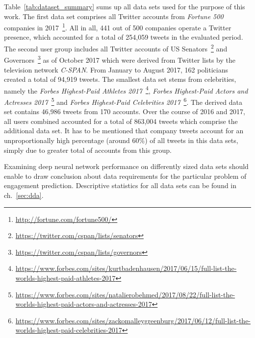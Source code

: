 Table~\ref{tab:dataset_summary} sums up all data sets used for the purpose of
this work.
The first data set comprises all Twitter accounts from \textit{Fortune 500}
companies in 2017~\footnote{\url{http://fortune.com/fortune500/}}.
All in all, 441 out of 500 companies operate a Twitter presence, which accounted
for a total of 254,059 tweets in the evaluated period.
The second user group includes all Twitter accounts of US Senators~\footnote{\url{https://twitter.com/cspan/lists/senators}} and Governors~\footnote{\url{https://twitter.com/cspan/lists/governors}}
as of October 2017 which were derived from Twitter lists by the television
network \textit{C-SPAN}.
From January to August 2017, 162 politicians created a total of 94,919 tweets.
The smallest data set stems from celebrities, namely the \textit{Forbes Highest-Paid
Athletes 2017}~\footnote{\url{https://www.forbes.com/sites/kurtbadenhausen/2017/06/15/full-list-the-worlds-highest-paid-athletes-2017}}, \textit{Forbes Highest-Paid Actors and Actresses 2017}~\footnote{\url{https://www.forbes.com/sites/natalierobehmed/2017/08/22/full-list-the-worlds-highest-paid-actors-and-actresses-2017}} and
\textit{Forbes Highest-Paid Celebrities 2017}~\footnote{\url{https://www.forbes.com/sites/zackomalleygreenburg/2017/06/12/full-list-the-worlds-highest-paid-celebrities-2017}}.
The derived data set contains 46,986 tweets from 170 accounts.
Over the course of 2016 and 2017, all users combined accounted for a total
of 863,004 tweets which comprise the additional data set.
It has to be mentioned that company tweets account for an unproportionally high
percentage (around 60\%) of all tweets in this data sets, simply due to greater
total of accounts from this group.

Examining deep neural network performance on differently sized data sets should
enable to draw conclusion about data requirements for the particular problem
of engagement prediction.
Descriptive statistics for all data sets can be found in ch.~\ref{sec:dda}.
